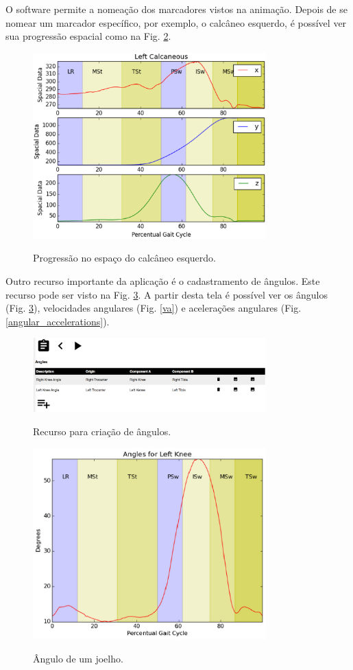 \documentclass[journal]{IEEEtran}
\begin{document}
O software permite a nomeação dos marcadores vistos na animação. Depois de se nomear um marcador
específico, por exemplo, o calcâneo esquerdo, é possível ver sua progressão espacial como na 
Fig. \ref{progressao}.

\begin{figure}[!t]
	\centering
	{\includegraphics[width=9cm]{tela19}}
	\caption{Progressão no espaço do calcâneo esquerdo. }
	\label{progressao}
\end{figure}

Outro recurso importante da aplicação é o cadastramento de ângulos. 
Este recurso pode ser visto na Fig. \ref{angulos}. 
A partir desta tela é possível ver os ângulos (Fig. \ref{angulos}), velocidades angulares (Fig. \ref{va}) e
acelerações angulares (Fig. \ref{angular_accelerations}).

\begin{figure}[!t]
	\centering
	{\includegraphics[width=9cm]{tela23}}
	\caption{Recurso para criação de ângulos. }
	\label{progressao}
\end{figure}

\begin{figure}[!t]
	\centering
	{\includegraphics[width=9cm]{tela25}}
	\caption{Ângulo de um joelho. }
	\label{angulos}
\end{figure}
\end{document}

